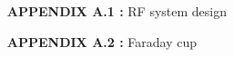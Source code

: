 \singlespacing


\begin{itemize}[leftmargin=3.3cm,itemsep=-0.4em,labelsep=1.5mm] %
\item [\textbf{APPENDIX A.1 :}]RF system design
\item [\textbf{APPENDIX A.2 :}]Faraday cup
\end{itemize}



\newpage